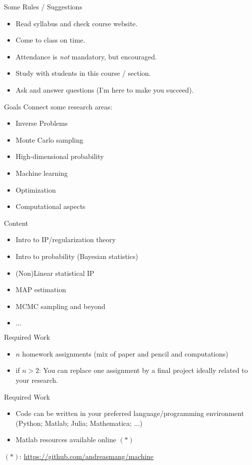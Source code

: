 \documentclass[mathserif,20pt,xcolor=table,compress,aspectratio=169]{beamer}
\begin{document}
\begin{frame}{Some Rules / Suggestions}
\begin{itemize}
\item Read syllabus and check course website.
\item Come to class on time.
\item Attendance is \emph{not} mandatory, but encouraged.
\item Study with students in this course / section.
\item Ask and answer questions (I'm here to make you succeed).
\end{itemize}
\end{frame}



\begin{frame}{Goals}
Connect some research areas:
\begin{itemize}
\item Inverse Problems
\item Monte Carlo sampling
\item High-dimensional probability
\item Machine learning
\item Optimization
\item Computational aspects
\end{itemize}
\end{frame}


\begin{frame}{Content}
\begin{itemize}
\item Intro to IP/regularization theory
\item Intro to probability (Bayesian statistics)
\item (Non)Linear statistical IP
\item MAP estimation
\item MCMC sampling and beyond
\item $\ldots$
\end{itemize}
\end{frame}


\begin{frame}{Required Work}
\begin{itemize}
\item $n$ homework assignments (mix of paper and pencil and computations)
\item if $n>2$: You can replace one assignment by a final project ideally related to your research.
\end{itemize}
\end{frame}

\begin{frame}{Required Work}
\begin{itemize}
\item Code can be written in your preferred language/programming environment (Python; Matlab; Julia; Mathematica; $\ldots$)
\item Matlab resources available online ${(\ast)}$
\end{itemize}
${(\ast)}$: \small\url{https://github.com/andreasmang/machine}
\end{frame}
\end{document}
